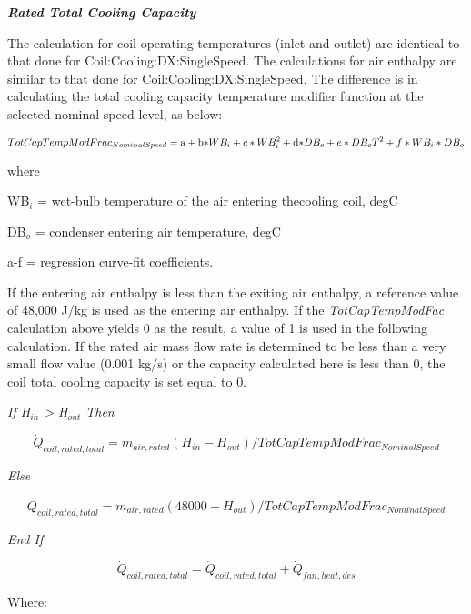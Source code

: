 \textbf{\emph{Rated Total Cooling Capacity}}

The calculation for coil operating temperatures (inlet and outlet) are identical to that done for Coil:Cooling:DX:SingleSpeed. The calculations for air enthalpy are similar to that done for Coil:Cooling:DX:SingleSpeed\emph{.} The difference is in calculating the total cooling capacity temperature modifier function at the selected nominal speed level, as below:

\begin{equation}
TotCapTempModFra{c_{NominalSpeed}} = {\rm{a}} + {\rm{b*}}W{B_i} + c*WB_i^2 + {\rm{d*}}D{B_o} + e*D{B_o}{T^2} + f*W{B_i}*D{B_o}
\end{equation}

where

WB\(_{i}\) = wet-bulb temperature of the air entering thecooling coil, degC

DB\(_{o}\) = condenser entering air temperature, degC

a-f = regression curve-fit coefficients.

If the entering air enthalpy is less than the exiting air enthalpy, a reference value of 48,000 J/kg is used as the entering air enthalpy. If the \emph{TotCapTempModFac} calculation above yields 0 as the result, a value of 1 is used in the following calculation. If the rated air mass flow rate is determined to be less than a very small flow value (0.001 kg/s) or the capacity calculated here is less than 0, the coil total cooling capacity is set equal to 0.

\emph{If H\(_{in}\) \textgreater{} H\(_{out}\) Then}

\begin{equation}
{\dot{Q}_{coil,rated,total}} = {m_{air,rated}}({H_{in}} - {H_{out}})/TotCapTempModFra{c_{NominalSpeed}}
\end{equation}

\emph{Else}

\begin{equation}
{\dot{Q}_{coil,rated,total}} = {m_{air,rated}}(48000 - {H_{out}})/TotCapTempModFra{c_{NominalSpeed}}
\end{equation}

\emph{End If}

\begin{equation}
{\dot{Q}_{coil,rated,total}} = {\dot{Q}_{coil,rated,total}} + \dot{Q}_{fan,heat,des}
\end{equation}

Where:

